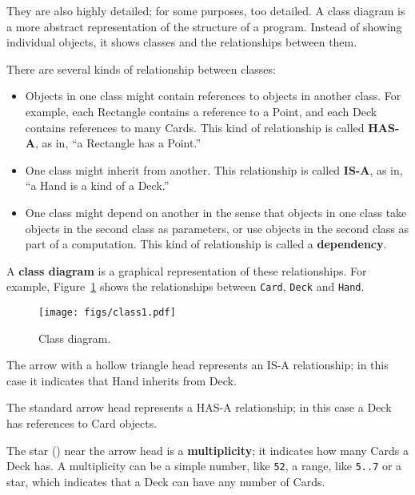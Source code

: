 \documentclass[10pt]{book}
\begin{document}
They are also highly detailed; for some purposes, too
detailed.  A class diagram is a more abstract representation
of the structure of a program.  Instead of showing individual
objects, it shows classes and the relationships between them.

There are several kinds of relationship between classes:

\begin{itemize}

\item Objects in one class might contain references to objects
in another class.  For example, each Rectangle contains a reference
to a Point, and each Deck contains references to many Cards.
This kind of relationship is called {\bf HAS-A}, as in, ``a Rectangle
has a Point.''

\item One class might inherit from another.  This relationship
is called {\bf IS-A}, as in, ``a Hand is a kind of a Deck.''

\item One class might depend on another in the sense that objects
in one class take objects in the second class as parameters, or
use objects in the second class as part of a computation.  This
kind of relationship is called a {\bf dependency}.

\end{itemize}

A {\bf class diagram} is a graphical representation of these
relationships.  For example, Figure~\ref{fig.class1} shows the
relationships between {\tt Card}, {\tt Deck} and {\tt Hand}.

\begin{figure}
\centerline
{\texttt{[image: figs/class1.pdf]}}
\caption{Class diagram.}
\label{fig.class1}
\end{figure}

The arrow with a hollow triangle head represents an IS-A
relationship; in this case it indicates that Hand inherits
from Deck.

The standard arrow head represents a HAS-A
relationship; in this case a Deck has references to Card
objects.

The star ({\tt *}) near the arrow head is a 
{\bf multiplicity}; it indicates how many Cards a Deck has.
A multiplicity can be a simple number, like {\tt 52}, a range,
like {\tt 5..7} or a star, which indicates that a Deck can
have any number of Cards.
\end{document}
